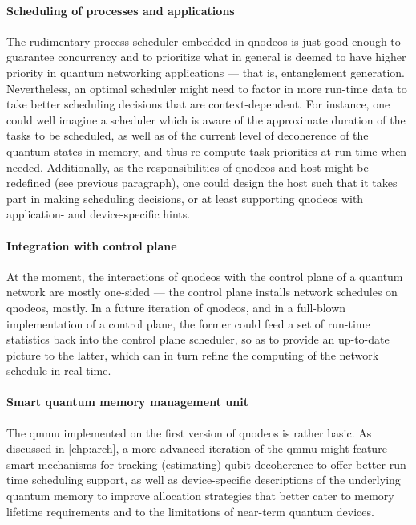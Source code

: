 \paragraph{Scheduling of processes and applications}

The rudimentary process scheduler embedded in \acrshort{qnodeos} is just good enough to guarantee
concurrency and to prioritize what in general is deemed to have higher priority in quantum
networking applications --- that is, entanglement generation. Nevertheless, an optimal scheduler
might need to factor in more run-time data to take better scheduling decisions that are
context-dependent. For instance, one could well imagine a scheduler which is aware of the
approximate duration of the tasks to be scheduled, as well as of the current level of decoherence of
the quantum states in memory, and thus re-compute task priorities at run-time when needed.
Additionally, as the responsibilities of \acrshort{qnodeos} and host might be redefined (see
previous paragraph), one could design the host such that it takes part in making scheduling
decisions, or at least supporting \acrshort{qnodeos} with application- and device-specific hints.

\paragraph{Integration with control plane}

At the moment, the interactions of \acrshort{qnodeos} with the control plane of a quantum network
are mostly one-sided --- the control plane installs network schedules on \acrshort{qnodeos}, mostly.
In a future iteration of \acrshort{qnodeos}, and in a full-blown implementation of a control plane,
the former could feed a set of run-time statistics back into the control plane scheduler, so as to
provide an up-to-date picture to the latter, which can in turn refine the computing of the network
schedule in real-time.

\paragraph{Smart quantum memory management unit}

The \acrfull{qmmu} implemented on the first version of \acrshort{qnodeos} is rather basic. As
discussed in \cref{chp:arch}, a more advanced iteration of the \acrshort{qmmu} might feature smart
mechanisms for tracking (estimating) qubit decoherence to offer better run-time scheduling support,
as well as device-specific descriptions of the underlying quantum memory to improve allocation
strategies that better cater to memory lifetime requirements and to the limitations of near-term
quantum devices.

